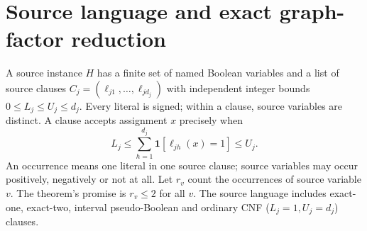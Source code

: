 \documentclass[11pt]{article}
\begin{document}
\section{Source language and exact graph-factor reduction}
A source instance \(H\) has a finite set of named Boolean variables and
a list of source clauses \(C_j=(\ell_{j1},\ldots,\ell_{jd_j})\) with
independent integer bounds \(0\le L_j\le U_j\le d_j\).
Every literal is signed; within a clause, source variables are distinct.
A clause accepts assignment \(x\) precisely when
\[
 L_j\le\sum_{h=1}^{d_j}\mathbf 1[\ell_{jh}(x)=1]\le U_j.
\]
An occurrence means one literal in one source clause; source variables
may occur positively, negatively or not at all.
Let \(r_v\) count the occurrences of source variable \(v\).
The theorem's promise is \(r_v\le2\) for all \(v\).
The source language includes exact-one, exact-two, interval
pseudo-Boolean and ordinary CNF (\(L_j=1,U_j=d_j\)) clauses.
\end{document}
